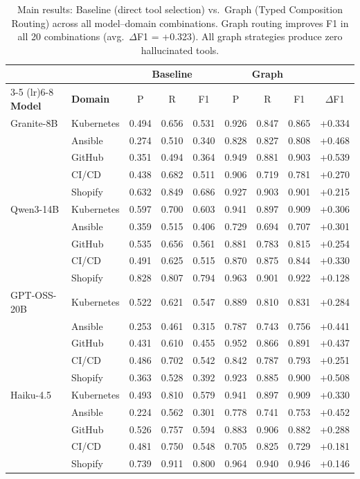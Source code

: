 \begin{table}[t]
\centering
\small
\begin{tabular}{ll ccc ccc c}
\toprule
& & \multicolumn{3}{c}{\textbf{Baseline}} & \multicolumn{3}{c}{\textbf{Graph}} & \\
\cmidrule(lr){3-5} \cmidrule(lr){6-8}
\textbf{Model} & \textbf{Domain} & P & R & F1 & P & R & F1 & $\Delta$F1 \\
\midrule
Granite-8B & Kubernetes & 0.494 & 0.656 & 0.531 & 0.926 & 0.847 & 0.865 & +0.334 \\
 & Ansible & 0.274 & 0.510 & 0.340 & 0.828 & 0.827 & 0.808 & +0.468 \\
 & GitHub & 0.351 & 0.494 & 0.364 & 0.949 & 0.881 & 0.903 & +0.539 \\
 & CI/CD & 0.438 & 0.682 & 0.511 & 0.906 & 0.719 & 0.781 & +0.270 \\
 & Shopify & 0.632 & 0.849 & 0.686 & 0.927 & 0.903 & 0.901 & +0.215 \\
\midrule
Qwen3-14B & Kubernetes & 0.597 & 0.700 & 0.603 & 0.941 & 0.897 & 0.909 & +0.306 \\
 & Ansible & 0.359 & 0.515 & 0.406 & 0.729 & 0.694 & 0.707 & +0.301 \\
 & GitHub & 0.535 & 0.656 & 0.561 & 0.881 & 0.783 & 0.815 & +0.254 \\
 & CI/CD & 0.491 & 0.625 & 0.515 & 0.870 & 0.875 & 0.844 & +0.330 \\
 & Shopify & 0.828 & 0.807 & 0.794 & 0.963 & 0.901 & 0.922 & +0.128 \\
\midrule
GPT-OSS-20B & Kubernetes & 0.522 & 0.621 & 0.547 & 0.889 & 0.810 & 0.831 & +0.284 \\
 & Ansible & 0.253 & 0.461 & 0.315 & 0.787 & 0.743 & 0.756 & +0.441 \\
 & GitHub & 0.431 & 0.610 & 0.455 & 0.952 & 0.866 & 0.891 & +0.437 \\
 & CI/CD & 0.486 & 0.702 & 0.542 & 0.842 & 0.787 & 0.793 & +0.251 \\
 & Shopify & 0.363 & 0.528 & 0.392 & 0.923 & 0.885 & 0.900 & +0.508 \\
\midrule
Haiku-4.5 & Kubernetes & 0.493 & 0.810 & 0.579 & 0.941 & 0.897 & 0.909 & +0.330 \\
 & Ansible & 0.224 & 0.562 & 0.301 & 0.778 & 0.741 & 0.753 & +0.452 \\
 & GitHub & 0.526 & 0.757 & 0.594 & 0.883 & 0.906 & 0.882 & +0.288 \\
 & CI/CD & 0.481 & 0.750 & 0.548 & 0.705 & 0.825 & 0.729 & +0.181 \\
 & Shopify & 0.739 & 0.911 & 0.800 & 0.964 & 0.940 & 0.946 & +0.146 \\
\bottomrule
\end{tabular}
\caption{Main results: Baseline (direct tool selection) vs.\ Graph (Typed Composition Routing) across all model--domain combinations. Graph routing improves F1 in all 20 combinations (avg.\ $\Delta$F1 = +0.323). All graph strategies produce zero hallucinated tools.}
\label{tab:main-results}
\end{table}